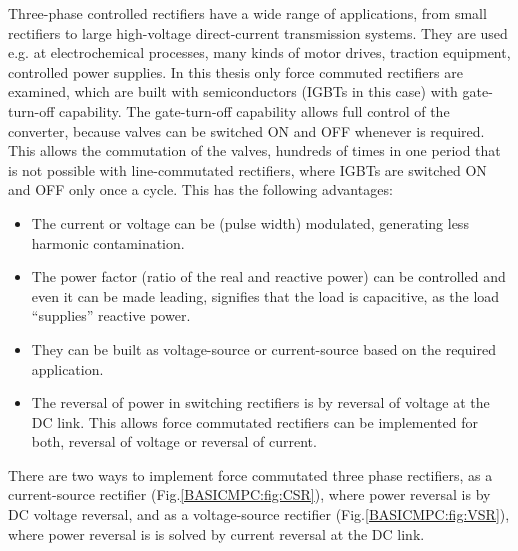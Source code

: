 Three-phase controlled rectifiers have a wide range of applications, from small rectifiers to large high-voltage direct-current transmission systems. They are used e.g. at electrochemical processes, many kinds of motor drives, traction equipment, controlled power supplies. In this thesis only force commuted rectifiers are examined, which are built with semiconductors (IGBTs in this case) with gate-turn-off capability. The gate-turn-off capability allows full control of the converter, because valves can be switched ON and OFF whenever is required. This allows the commutation of the valves, hundreds of times in one period that is not possible with line-commutated rectifiers, where IGBTs are switched ON and OFF only once a cycle. This has the following advantages:

\begin{itemize}
\item The current or voltage can be (pulse width) modulated, generating less harmonic contamination.
\item The power factor (ratio of the real and reactive power) can be controlled and even it can be made leading, signifies that the load is capacitive, as the load “supplies” reactive power.
\item They can be built as voltage-source or current-source based on the required application.
\item The reversal of power in switching rectifiers is by reversal of voltage at the DC link. This allows force commutated rectifiers can be implemented for both, reversal of voltage or reversal of current.
\end{itemize}

There are two ways to implement force commutated three phase rectifiers, as a current-source rectifier (Fig.\ref{BASICMPC:fig:CSR}), where power reversal is by DC voltage reversal, and as a voltage-source rectifier (Fig.\ref{BASICMPC:fig:VSR}), where power reversal is is solved by current reversal at the DC link.


